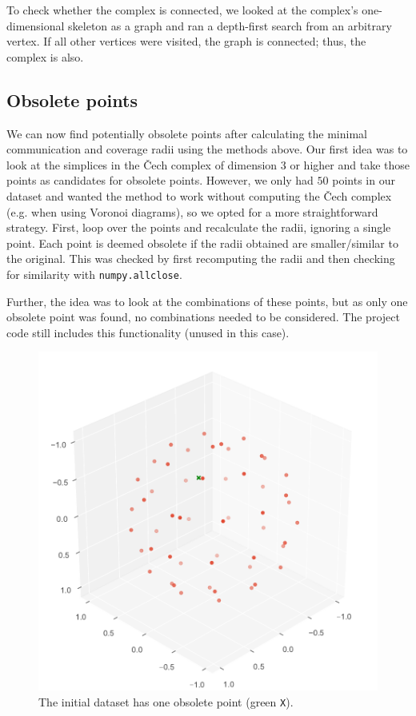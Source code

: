 \documentclass[twocolumn]{article}
\begin{document}
To check whether the complex is connected, we looked at the complex's one-dimensional skeleton as a graph and ran a depth-first search from an arbitrary vertex. If all other vertices were visited, the graph is connected; thus, the complex is also.

\subsection{Obsolete points}
We can now find potentially obsolete points after calculating the minimal communication and coverage radii using the methods above. Our first idea was to look at the simplices in the Čech complex of dimension $3$ or higher and take those points as candidates for obsolete points. However, we only had $50$ points in our dataset and wanted the method to work without computing the Čech complex (e.g. when using Voronoi diagrams), so we opted for a more straightforward strategy. First, loop over the points and recalculate the radii, ignoring a single point. Each point is deemed obsolete if the radii obtained are smaller/similar to the original. This was checked by first recomputing the radii and then checking for similarity with \texttt{numpy.allclose}.

Further, the idea was to look at the combinations of these points, but as only one obsolete point was found, no combinations needed to be considered. The project code still includes this functionality (unused in this case).

\begin{figure}[H]
    \centering
    \includegraphics[width=\columnwidth]{fig/obsolete}
    \caption{The initial dataset has one obsolete point (green \texttt{X}).}
    \label{fig:obsolete}
\end{figure}
\end{document}
